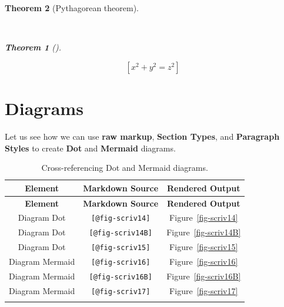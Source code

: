 \documentclass[
  12pt,
  a4paper,
  oneside,
  numbers=noenddot,
  titlepage,
  toclink=all,
  toc=bibliography]{scrbook}
\theoremstyle{definition}
\theoremstyle{definition}
\theoremstyle{definition}
\theoremstyle{plain}
\theoremstyle{plain}
\theoremstyle{plain}
\theoremstyle{plain}
\theoremstyle{plain}
\newtheorem{theorem}{Theorem}[section]
\theoremstyle{remark}
\begin{document}
\begin{theorem}[Pythagorean
theorem]\protect\hypertarget{thm-scriv12}{}\label{thm-scriv12}

~

\begin{theorem}[]\protect\hypertarget{thm-scriv12}{}\label{thm-scriv12}

\[[ x^2 + y^2 = z^2 ]\]

\end{theorem}

\end{theorem}

\newpage{}

\hypertarget{sec-scriv13}{%
\section{Diagrams}\label{sec-scriv13}}

Let us see how we can use \textbf{raw markup}, \textbf{Section Types},
and \textbf{Paragraph Styles} to create \textbf{Dot} and
\textbf{Mermaid} diagrams.

\hypertarget{tbl-scriv13}{}
\begin{longtable}[]{@{}ccc@{}}
\toprule\noalign{}
\textbf{Element} & \textbf{Markdown Source} & \textbf{Rendered
Output} \\
\midrule\noalign{}
\endfirsthead
\toprule\noalign{}
\textbf{Element} & \textbf{Markdown Source} & \textbf{Rendered
Output} \\
\midrule\noalign{}
\endhead
\bottomrule\noalign{}
\endlastfoot
Diagram Dot & \texttt{{[}@fig-scriv14{]}} &
\protect\hypertarget{cite_65}{}{\label{cite_65}Figure~\ref{fig-scriv14}} \\
Diagram Dot & \texttt{{[}@fig-scriv14B{]}} &
\protect\hypertarget{cite_66}{}{\label{cite_66}Figure~\ref{fig-scriv14B}} \\
Diagram Dot & \texttt{{[}@fig-scriv15{]}} &
\protect\hypertarget{cite_67}{}{\label{cite_67}Figure~\ref{fig-scriv15}} \\
Diagram Mermaid & \texttt{{[}@fig-scriv16{]}} &
\protect\hypertarget{cite_68}{}{\label{cite_68}Figure~\ref{fig-scriv16}} \\
Diagram Mermaid & \texttt{{[}@fig-scriv16B{]}} &
\protect\hypertarget{cite_69}{}{\label{cite_69}Figure~\ref{fig-scriv16B}} \\
Diagram Mermaid & \texttt{{[}@fig-scriv17{]}} &
\protect\hypertarget{cite_70}{}{\label{cite_70}Figure~\ref{fig-scriv17}} \\
\caption{\label{tbl-scriv13}Cross-referencing Dot and Mermaid
diagrams.}\tabularnewline
\end{longtable}
\end{document}
